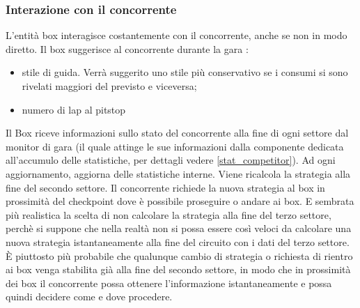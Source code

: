 \subsubsection{Interazione con il concorrente}
L'entità box interagisce costantemente con il concorrente, anche se non in modo
diretto.
Il box suggerisce al concorrente durante la gara :
\begin{itemize}
\item stile di guida. Verrà suggerito uno stile più conservativo se i consumi si
sono rivelati maggiori del previsto e viceversa;
\item numero di lap al pitstop
\end{itemize}
Il Box riceve informazioni sullo stato del concorrente alla fine di ogni settore dal monitor di gara (il quale attinge
le sue informazioni dalla componente dedicata all'accumulo delle statistiche, per dettagli vedere \ref{stat_competitor}).
Ad ogni aggiornamento, aggiorna delle statistiche interne. Viene ricalcola la strategia alla fine del secondo settore. 
Il concorrente richiede
la  nuova strategia al box in prossimità del checkpoint dove è possibile
proseguire o andare ai box.
E sembrata più realistica la scelta di non calcolare la strategia alla fine del
terzo settore, perchè si suppone che nella realtà non si possa essere così
veloci da calcolare una nuova strategia istantaneamente alla fine del circuito
con i dati del terzo settore. \`{E} piuttosto più probabile che qualunque cambio
di strategia o richiesta di rientro ai box venga stabilita già alla fine del
secondo settore, in modo che in prossimità dei box il concorrente possa ottenere
l’informazione istantaneamente e possa quindi decidere come e dove procedere.
